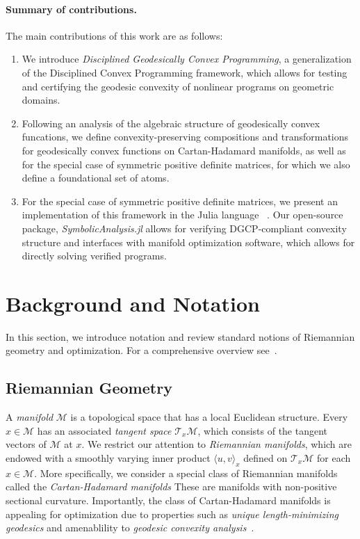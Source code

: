 \documentclass[twoside,11pt]{article}
\begin{document}
\paragraph{Summary of contributions.}
The main contributions of this work are as follows:
\begin{enumerate}
    \item We introduce \emph{Disciplined Geodesically Convex Programming}, a generalization of the Disciplined Convex Programming framework, which allows for testing and certifying the geodesic convexity of nonlinear programs on geometric domains.
    \item Following an analysis of the algebraic structure of geodesically convex funcations, we define convexity-preserving compositions and transformations for geodesically convex functions on Cartan-Hadamard manifolds, as well as for the special case of symmetric positive definite matrices, for which we also define a foundational set of atoms.
    \item For the special case of symmetric positive definite matrices, we present an implementation of this framework in the Julia language ~\citep{bezanson2017julia}. Our open-source package, \textsl{SymbolicAnalysis.jl} allows for verifying DGCP-compliant convexity structure and interfaces with  manifold optimization software, which allows for directly solving verified programs.
\end{enumerate}


\section{Background and Notation}
In this section, we introduce notation and review standard notions of Riemannian geometry and optimization. For a comprehensive overview see~\citep{boumal2020introduction,bacak2014convex}.

\subsection{Riemannian Geometry}\label{sec:Riemannian_Geometry}
A \textit{manifold} $\mathcal{M}$ is a topological space that has a local Euclidean structure. Every $x \in \mathcal{M}$ has an associated \textit{tangent space} $\mathcal{T}_x \mathcal{M}$, which consists of the tangent vectors of $\mathcal{M}$ at $x$. We restrict our attention to \textit{Riemannian manifolds}, which are endowed with a smoothly varying inner product $\langle u, v \rangle_x$ defined on $\mathcal{T}_x \mathcal{M}$ for each $x \in \mathcal{M}$. More specifically, we consider a special class of Riemannian manifolds called the \emph{Cartan-Hadamard manifolds} These are manifolds with non-positive sectional curvature. Importantly, the class of Cartan-Hadamard manifolds is appealing for optimization due to properties such as \textit{unique length-minimizing geodesics} and amenablility to \textit{geodesic convexity analysis}~\citep{bacak2014convex}. 
\end{document}
